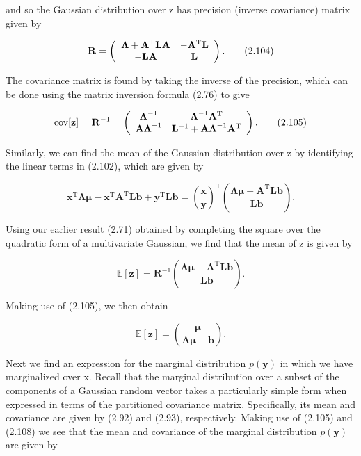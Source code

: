 \documentclass[
  10
]{article}
\begin{document}
and so the Gaussian distribution over z has precision (inverse
covariance) matrix given by

\[
\mathbf {R} = \left( \begin{array}{c c} \mathbf {\Lambda} + \mathbf {A} ^ {\mathrm{T}} \mathbf {L} \mathbf {A} & - \mathbf {A} ^ {\mathrm{T}} \mathbf {L} \\ - \mathbf {L} \mathbf {A} & \mathbf {L} \end{array} \right).\tag{2.104}
\]

The covariance matrix is found by taking the inverse of the precision,
which can be done using the matrix inversion formula (2.76) to give

\[
\operatorname{cov} [ \mathbf {z} ] = \mathbf {R} ^ {- 1} = \left( \begin{array}{c c} \boldsymbol {\Lambda} ^ {- 1} & \boldsymbol {\Lambda} ^ {- 1} \mathbf {A} ^ {\mathrm{T}} \\ \mathbf {A} \boldsymbol {\Lambda} ^ {- 1} & \mathbf {L} ^ {- 1} + \mathbf {A} \boldsymbol {\Lambda} ^ {- 1} \mathbf {A} ^ {\mathrm{T}} \end{array} \right).\tag{2.105}
\]

Similarly, we can find the mean of the Gaussian distribution over z by
identifying the linear terms in (2.102), which are given by

\[
\mathbf {x} ^ {\mathrm{T}} \boldsymbol {\Lambda} \boldsymbol {\mu} - \mathbf {x} ^ {\mathrm{T}} \mathbf {A} ^ {\mathrm{T}} \mathbf {L} \mathbf {b} + \mathbf {y} ^ {\mathrm{T}} \mathbf {L} \mathbf {b} = \binom{\mathbf {x}}{\mathbf {y}} ^ {\mathrm{T}} \binom{\boldsymbol {\Lambda} \boldsymbol {\mu} - \mathbf {A} ^ {\mathrm{T}} \mathbf {L} \mathbf {b}}{\mathbf {L} \mathbf {b}}.\tag{2.106}
\]

Using our earlier result (2.71) obtained by completing the square over
the quadratic form of a multivariate Gaussian, we find that the mean of
z is given by

\[
\mathbb {E} [ \mathbf {z} ] = \mathbf {R} ^ {- 1} \binom{\boldsymbol {\Lambda} \boldsymbol {\mu} - \mathbf {A} ^ {\mathrm{T}} \mathbf {L b}}{\mathbf {L b}}.\tag{2.107}
\]

Making use of (2.105), we then obtain

\[
\mathbb {E} [ \mathbf {z} ] = \binom{\boldsymbol {\mu}}{\mathbf {A} \boldsymbol {\mu} + \mathbf {b}}.\tag{2.108}
\]

Next we find an expression for the marginal distribution
\(p ( \mathbf { y } )\) in which we have marginalized over x. Recall
that the marginal distribution over a subset of the components of a
Gaussian random vector takes a particularly simple form when expressed
in terms of the partitioned covariance matrix. Specifically, its mean
and covariance are given by (2.92) and (2.93), respectively. Making use
of (2.105) and (2.108) we see that the mean and covariance of the
marginal distribution \(p ( \mathbf { y } )\) are given by
\end{document}
